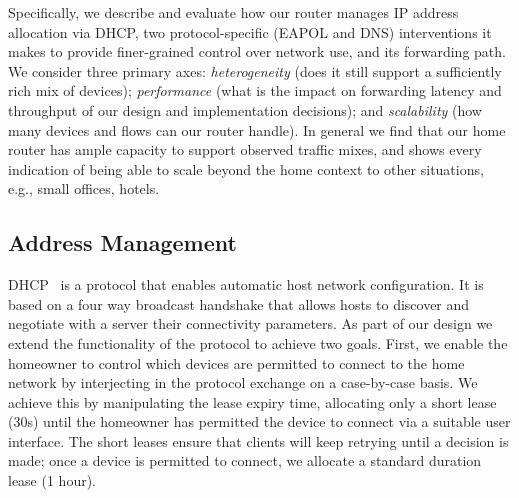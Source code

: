 Specifically, we describe and evaluate how our router manages IP address
allocation via DHCP, two protocol-specific (EAPOL and DNS) interventions it
makes to provide finer-grained control over network use, and its forwarding
path.  We consider three primary axes: \emph{heterogeneity} (does it still
support a sufficiently rich mix of devices); \emph{performance} (what is the
impact on forwarding latency and throughput of our design and implementation
decisions); and \emph{scalability} (how many devices and flows can our router
handle).  In general we find that our home router has ample capacity to support
observed traffic mixes, and shows every indication of being able to scale beyond
the home context to other situations, e.g., small offices, hotels. 

\subsection{Address Management} \label{s:addresses}

DHCP~\cite{rfc:2131} is a protocol that enables automatic host network
configuration. It is based on a four way broadcast handshake that allows hosts
to discover and negotiate with a server their connectivity parameters.  As part
of our design we extend the functionality of the protocol to achieve two goals.
First, we enable the homeowner to control which devices are permitted to connect
to the home network by interjecting in the protocol exchange on a case-by-case
basis.  We achieve this by manipulating the lease expiry time, allocating only a
short lease (30s) until the homeowner has permitted the device to connect via a
suitable user interface.  The short leases ensure that clients will keep
retrying until a decision is made; once a device is permitted to connect, we
allocate a standard duration lease (1 hour).

